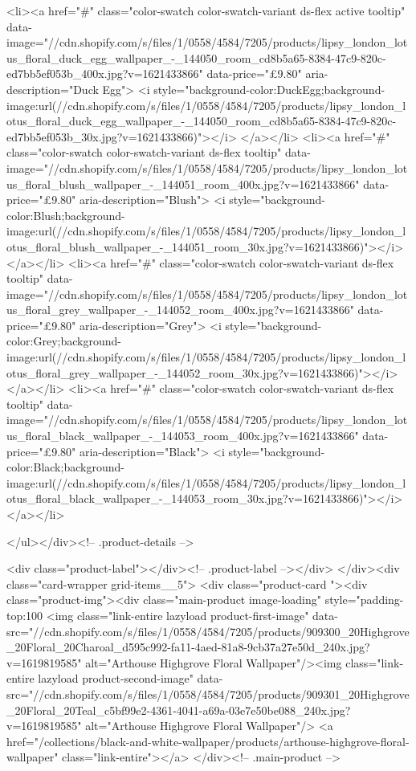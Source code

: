{{{{{{{<li><a href="#" class="color-swatch color-swatch-variant ds-flex active tooltip" data-image="//cdn.shopify.com/s/files/1/0558/4584/7205/products/lipsy_london_lotus_floral_duck_egg_wallpaper_-_144050_room_cd8b5a65-8384-47c9-820c-ed7bb5ef053b_400x.jpg?v=1621433866" data-price="£9.80" aria-description="Duck Egg">
              <i style="background-color:DuckEgg;background-image:url(//cdn.shopify.com/s/files/1/0558/4584/7205/products/lipsy_london_lotus_floral_duck_egg_wallpaper_-_144050_room_cd8b5a65-8384-47c9-820c-ed7bb5ef053b_30x.jpg?v=1621433866)"></i>
            </a></li>
<li><a href="#" class="color-swatch color-swatch-variant ds-flex tooltip" data-image="//cdn.shopify.com/s/files/1/0558/4584/7205/products/lipsy_london_lotus_floral_blush_wallpaper_-_144051_room_400x.jpg?v=1621433866" data-price="£9.80" aria-description="Blush">
              <i style="background-color:Blush;background-image:url(//cdn.shopify.com/s/files/1/0558/4584/7205/products/lipsy_london_lotus_floral_blush_wallpaper_-_144051_room_30x.jpg?v=1621433866)"></i>
            </a></li>
<li><a href="#" class="color-swatch color-swatch-variant ds-flex tooltip" data-image="//cdn.shopify.com/s/files/1/0558/4584/7205/products/lipsy_london_lotus_floral_grey_wallpaper_-_144052_room_400x.jpg?v=1621433866" data-price="£9.80" aria-description="Grey">
              <i style="background-color:Grey;background-image:url(//cdn.shopify.com/s/files/1/0558/4584/7205/products/lipsy_london_lotus_floral_grey_wallpaper_-_144052_room_30x.jpg?v=1621433866)"></i>
            </a></li>
<li><a href="#" class="color-swatch color-swatch-variant ds-flex tooltip" data-image="//cdn.shopify.com/s/files/1/0558/4584/7205/products/lipsy_london_lotus_floral_black_wallpaper_-_144053_room_400x.jpg?v=1621433866" data-price="£9.80" aria-description="Black">
              <i style="background-color:Black;background-image:url(//cdn.shopify.com/s/files/1/0558/4584/7205/products/lipsy_london_lotus_floral_black_wallpaper_-_144053_room_30x.jpg?v=1621433866)"></i>
            </a></li>

      </ul></div><!-- .product-details -->

<div class="product-label"></div><!-- .product-label --></div>
          </div><div class="card-wrapper grid-items__5">
            <div class="product-card "><div class="product-img"><div class="main-product image-loading" style="padding-top:100%
      <img class="link-entire lazyload product-first-image" data-src="//cdn.shopify.com/s/files/1/0558/4584/7205/products/909300_20Highgrove_20Floral_20Charoal_d595c992-fa11-4aed-81a8-9cb37a27e50d_240x.jpg?v=1619819585" alt="Arthouse Highgrove Floral Wallpaper"/><img class="link-entire lazyload product-second-image" data-src="//cdn.shopify.com/s/files/1/0558/4584/7205/products/909301_20Highgrove_20Floral_20Teal_c5bf99e2-4361-4041-a69a-03e7e50be088_240x.jpg?v=1619819585" alt="Arthouse Highgrove Floral Wallpaper"/>
      <a href="/collections/black-and-white-wallpaper/products/arthouse-highgrove-floral-wallpaper" class="link-entire"></a>
    </div><!-- .main-product -->
  
}}}}}}}
